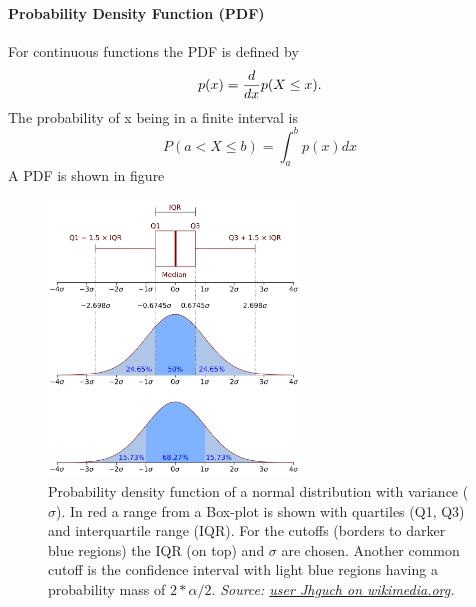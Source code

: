 \documentclass[../main.tex]{subfiles}
\begin{document}
        \paragraph{Probability Density Function (PDF)}  For continuous functions the PDF is defined by 
                \begin{equation}
                    p(x) =  {d \over dx} p(X \leq x).
                \end{equation}
                The probability of x being in a finite interval is
                \begin{equation}
                    P(a < X \leq b) = \int_a^b p(x) dx
                \end{equation}
                A PDF is shown in figure
                \begin{figure}
                    \centering
                    \includegraphics[width=0.6\textwidth]{../figures/Boxplot_vs_PDF.png}
                    \caption{Probability density function of a normal distribution with variance ($\sigma$). In red a range from a Box-plot is shown with quartiles (Q1, Q3) and interquartile range (IQR). For the cutoffs (borders to darker blue regions) the IQR (on top) and $\sigma$ are chosen. Another common cutoff is the confidence interval with light blue regions having a probability mass of $2 * \alpha / 2$. \textit{Source: \href{https://commons.wikimedia.org/wiki/File:Boxplot_vs_PDF.svg}{user Jhguch on wikimedia.org}.}}
                    \label{Boxplot}
                \end{figure}
\end{document}
